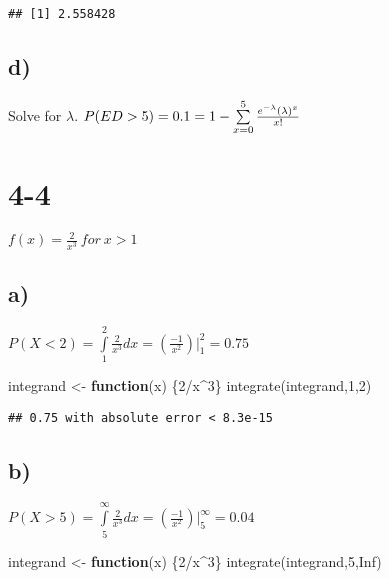 \documentclass[
]{article}
\newenvironment{Shaded}{\begin{snugshade}}{\end{snugshade}}
\newcommand{\ConstantTok}[1]{\textcolor[rgb]{0.00,0.00,0.00}{#1}}
\newcommand{\ControlFlowTok}[1]{\textcolor[rgb]{0.13,0.29,0.53}{\textbf{#1}}}
\newcommand{\DecValTok}[1]{\textcolor[rgb]{0.00,0.00,0.81}{#1}}
\newcommand{\FunctionTok}[1]{\textcolor[rgb]{0.00,0.00,0.00}{#1}}
\newcommand{\NormalTok}[1]{#1}
\newcommand{\OtherTok}[1]{\textcolor[rgb]{0.56,0.35,0.01}{#1}}
\newcommand{\SpecialCharTok}[1]{\textcolor[rgb]{0.00,0.00,0.00}{#1}}
\begin{document}
\begin{verbatim}
## [1] 2.558428
\end{verbatim}

\hypertarget{d}{%
\subsection{d)}\label{d}}

Solve for \(\lambda\).
\(P(ED>5)=0.1 = 1- \sum\limits_{x=0}^{5}\frac{e^{-\lambda}(\lambda)^x}{x!}\\\)

\hypertarget{section-2}{%
\section{4-4}\label{section-2}}

\(f(x)=\frac{2}{x^3} \: for\:x>1\)

\hypertarget{a-2}{%
\subsection{a)}\label{a-2}}

\(P(X<2) = \int\limits_{1}^{2}\frac{2}{x^3}dx= \left( \frac{-1}{x^2}\right)|_{1}^{2} = 0.75\)

\begin{Shaded}
\begin{Highlighting}[]
\NormalTok{integrand }\OtherTok{\textless{}{-}} \ControlFlowTok{function}\NormalTok{(x) \{}\DecValTok{2}\SpecialCharTok{/}\NormalTok{x}\SpecialCharTok{\^{}}\DecValTok{3}\NormalTok{\}}
\FunctionTok{integrate}\NormalTok{(integrand,}\DecValTok{1}\NormalTok{,}\DecValTok{2}\NormalTok{)}
\end{Highlighting}
\end{Shaded}

\begin{verbatim}
## 0.75 with absolute error < 8.3e-15
\end{verbatim}

\hypertarget{b-2}{%
\subsection{b)}\label{b-2}}

\(P(X>5) = \int\limits_{5}^{\infty}\frac{2}{x^3}dx= \left( \frac{-1}{x^2}\right)|_{5}^{\infty} = 0.04\)

\begin{Shaded}
\begin{Highlighting}[]
\NormalTok{integrand }\OtherTok{\textless{}{-}} \ControlFlowTok{function}\NormalTok{(x) \{}\DecValTok{2}\SpecialCharTok{/}\NormalTok{x}\SpecialCharTok{\^{}}\DecValTok{3}\NormalTok{\}}
\FunctionTok{integrate}\NormalTok{(integrand,}\DecValTok{5}\NormalTok{,}\ConstantTok{Inf}\NormalTok{)}
\end{Highlighting}
\end{Shaded}
\end{document}

